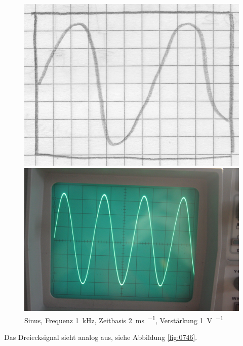 \begin{figure}
	\centering
	\begin{minipage}{.45\linewidth}
	\includegraphics[width=\linewidth]{Skizzen/IMG_0745-1500.jpg}
	\end{minipage}
	\hfill
	\begin{minipage}{.45\linewidth}
	\includegraphics[width=\linewidth]{Fotos/IMG_0745-1500.jpg}
	\end{minipage}
	\caption{%
		Sinus, Frequenz \SI{1}{\kilo\hertz}, Zeitbasis \SI{2}{\milli\second\per\division}, Verstärkung \SI{1}{\volt\per\division}
	}
	\label{fig:0745}
\end{figure}

Das Dreiecksignal sieht analog aus, siehe Abbildung \ref{fig:0746}.

